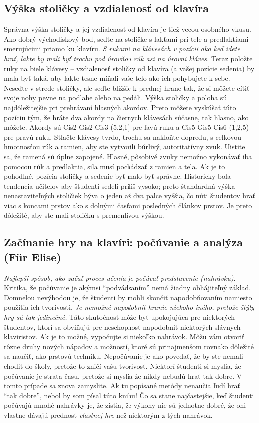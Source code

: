 \subsection{Výška stoličky a vzdialenosť od klavíra}
Správna výška stoličky a jej vzdialenosť od klavíra je tiež vecou osobného vkusu. Ako dobrý východiskový bod, seďte na stoličke s lakťami pri tele a predlaktiami smerujúcimi priamo ku klavíru. \emph{S rukami na klávesách v pozícii ako keď idete hrať, lakte by mali byť trochu pod úrovňou rúk asi na úrovni kláves.} Teraz položte ruky na biele klávesy – vzdialenosť stoličky od klavíra (a vašej pozície sedenia) by mala byť taká, aby lakte tesne míňali vaše telo ako ich pohybujete k sebe. Neseďte v strede stoličky, ale seďte bližšie k prednej hrane tak, že si môžete cítiť svoje nohy pevne na podlahe alebo na pedáli. Výška stoličky a poloha sú najdôležitejšie pri prehrávaní hlasných akordov. Preto môžete vyskúšať túto pozíciu tým, že hráte dva akordy na čiernych klávesách súčasne, tak hlasno, ako môžete. Akordy sú Cis2 Gis2 Cis3 (5,2,1) pre ľavú ruku a Cis5 Gis5 Cis6 (1,2,5) pre pravú ruku. Stlačte klávesy tvrdo, trochu sa nakloňte dopredu, s celkovou hmotnosťou rúk a ramien, aby ste vytvorili búrlivý, autoritatívny zvuk. Uistite sa, že ramená sú úplne zapojené. Hlasné, pôsobivé zvuky nemožno vykonávať iba pomocou rúk a predlaktia, sila musí pochádzať z ramien a tela. Ak je to pohodlné, pozícia stoličky a sedenie byť malo byť správne. Historicky  bola tendencia učiteľov aby študenti sedeli príliš vysoko; preto štandardná výška nenastaviteľných stoličiek býva o jeden až dva palce vyššia, čo núti študentov hrať viac s koncami prstov ako s dolnými časťami posledných článkov prstov. Je preto dôležité, aby ste mali stoličku s premenlivou výškou.

\subsection{Začínanie hry na klavíri: počúvanie a analýza (Für Elise)}
\emph{Najlepší spôsob, ako začať proces učenia je počúvať predstavenie (nahrávku).} Kritika, že počúvanie je akýmsi “podvádzaním” nemá žiadny obhájiteľný základ. Domnelou nevýhodou je, že študenti by mohli skončiť napodobňovaním namiesto použitia ich tvorivosti. \emph{Je nemožné napodobniť hranie niekoho iného, pretože štýly hry sú tak jedinečné.} Táto skutočnosť môže byť upokojujúca pre niektorých študentov, ktorí sa obviňujú pre neschopnosť napodobniť niektorých slávnych klaviristov. Ak je to možné, vypočujte si niekoľko nahrávok. Môžu vám otvoriť rôzne  druhy nových nápadov a možností, ktoré sú prinajmenšom rovnako dôležité sa naučiť, ako prstovú  techniku. Nepočúvanie je ako povedať, že by ste nemali chodiť do školy, pretože to zničí vašu  tvorivosť. Niektorí študenti si myslia, že počúvanie je strata času, pretože si myslia že nikdy nebudú hrať tak dobre. V tomto prípade sa znova zamyslite. Ak tu popísané metódy nenaučia ľudí hrať “tak dobre”, nebol by som písal túto knihu! Čo sa stane najčastejšie, keď študenti počúvajú mnohé nahrávky je, že zistia, že výkony nie sú jednotne dobré, že oni vlastne dávajú prednosť \emph{vlastnej hre} než niektorým z tých nahrávok.

